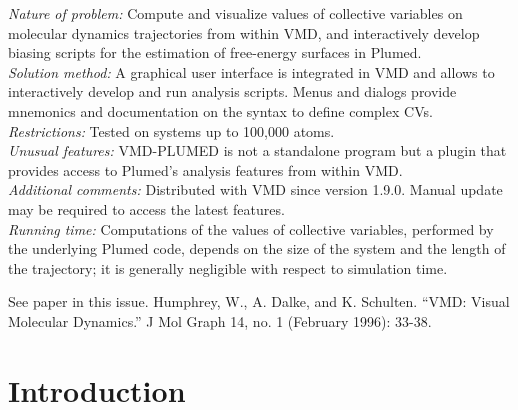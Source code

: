 \documentclass[preprint,review,11pt]{elsarticle}
\begin{document}
\begin{small}
  {\em Nature of problem:} Compute and visualize values of collective
  variables on molecular dynamics trajectories from within VMD, and
  interactively develop biasing scripts for the estimation of
  free-energy surfaces in Plumed.
  \\
  {\em Solution method:} A graphical user interface is integrated in
  VMD and allows to interactively develop and run analysis scripts.
  Menus and dialogs provide mnemonics and documentation on the syntax
  to define complex CVs.
  \\
  {\em Restrictions:}
  Tested on systems up to 100,000 atoms. \\
  {\em Unusual features:} VMD-PLUMED is not a standalone program but a
  plugin that provides access to Plumed's analysis features from within VMD. \\
  {\em Additional comments:} Distributed with VMD since version 1.9.0.
  Manual  update may be required  to access the latest features.   \\
  {\em Running time:} Computations of the values of collective
  variables, performed by the underlying Plumed code, depends on the
  size of the system and the length  of the trajectory; it is 
  generally negligible with respect to simulation time.  \\
\begin{thebibliography}{0}
See paper in this issue.
Humphrey, W., A. Dalke, and K. Schulten. ``VMD: Visual
  Molecular Dynamics.'' J Mol Graph 14, no. 1 (February 1996): 33-38.
\end{thebibliography}

\end{small}



\section{Introduction}
\end{document}
